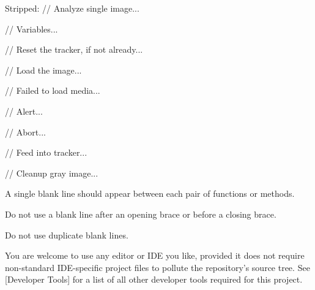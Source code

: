Stripped:
\startCodeExample
// Analyze single image...

    // Variables...

    // Reset the tracker, if not already...

    // Load the image...

        // Failed to load media...

            // Alert...

            // Abort...

    // Feed into tracker...
    
    // Cleanup gray image...
\stopCodeExample

\item
A single blank line should appear between each pair of functions or methods. 

\item
Do not use a blank line after an opening brace or before a closing brace.

\item
Do not use duplicate blank lines.
\stopitemize


You are welcome to use any editor or IDE you like, provided it does not require non-standard IDE-specific project files to pollute the repository's source tree. See [Developer Tools] for a list of all other developer tools required for this project.


